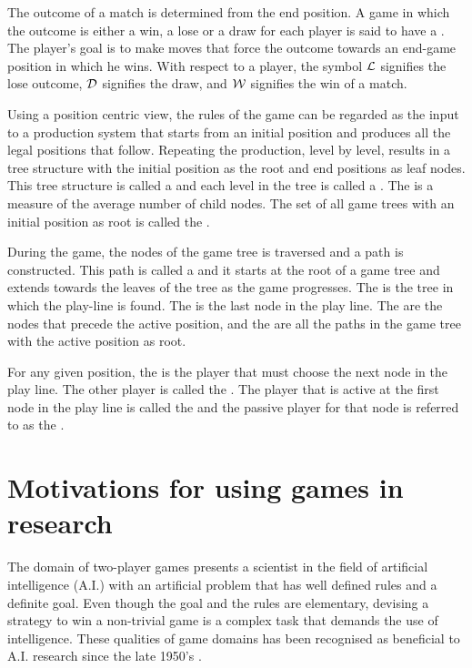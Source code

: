 The outcome of a match is determined from the end position.  A game in which the outcome is either a win, a lose or a draw for each player is said to have a   \cite{davis:evolve}.  The player's goal is to make moves that force the outcome towards an end-game position in which he wins. With respect to a player, the symbol ${\mathcal L}$ signifies the lose outcome, ${\mathcal D}$ signifies the draw, and ${\mathcal W}$ signifies the win of a match.   

Using a position centric view, the rules of the game can be regarded as the input to a production system that starts from an initial position and produces all the legal positions that follow.  Repeating the production, level by level, results in a tree structure with the initial position as the root and end positions as leaf nodes. This tree structure is called a  and each level in the tree is called a  \cite{samuel:checkers}.  The  is a measure of the average number of child nodes. The set of all game trees with an initial position as root is called the .  

During the game, the nodes of the game tree is traversed and a path is constructed.  This path is called a  and it starts at the root of a game tree and extends towards the leaves of the tree as the game progresses.  The  is the tree in which the play-line is found. The  is the last node in the play line.  The  are the nodes that precede the active position, and the  are all the paths in the game tree with the active position as root.  

For any given position, the  is the player that must choose the next node in the play line.  The other player is called the .  The player that is active at the first node in the play line is called the  and the passive player for that node is referred to as the .


\section{Motivations for using games in research}
\label{sec:motives}
The domain of two-player games presents a scientist in the field of artificial intelligence (A.I.) with an artificial problem that has well defined rules and a definite goal.  Even though the goal and the rules are elementary, devising a strategy to win a non-trivial game is a complex task that demands the use of intelligence. These qualities of game domains has been recognised as beneficial to A.I. research since the late 1950's \cite{samuel:checkers}.      

